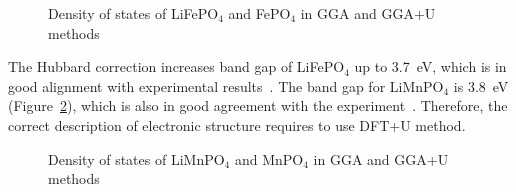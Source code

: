 \begin{figure}[ht]
\caption{Density of states of LiFePO$_4$ and FePO$_4$ in GGA and GGA+U methods}
\label{ris:LFPel}
\end{figure}

The Hubbard correction increases band gap of LiFePO$_4$ up to 3.7~eV, which is in  good alignment with experimental results~\cite{zaghib2007electronic}. The band gap for LiMnPO$_4$ is 3.8~eV (Figure~\ref{ris:LMPel}), which is also in good agreement with the experiment~\cite{zhang2019selecting}. Therefore, the correct description of electronic structure requires to use DFT+U method.

\begin{figure}[ht]
\caption{Density of states of LiMnPO$_4$ and MnPO$_4$ in GGA and GGA+U methods}
\label{ris:LMPel}
\end{figure}

